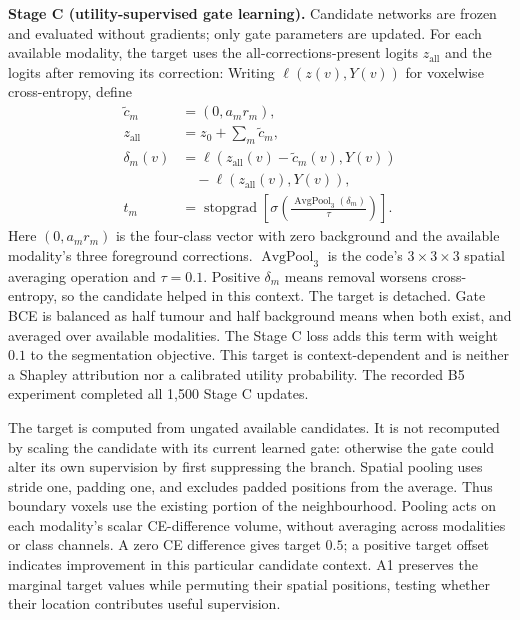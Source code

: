 \documentclass[conference]{IEEEtran}
\begin{document}
\textbf{Stage C (utility-supervised gate learning).} Candidate networks are frozen and evaluated without gradients; only gate parameters are updated. For each available modality, the target uses the all-corrections-present logits $z_{\mathrm{all}}$ and the logits after removing its correction:
Writing $\ell(z(v),Y(v))$ for voxelwise cross-entropy, define
\begin{align}
\tilde c_m&=(0,a_mr_m),\nonumber\\
z_{\mathrm{all}}&=z_0+\sum_m\tilde c_m,
\label{eq:candidates}\\
\delta_m(v)&=\ell(z_{\mathrm{all}}(v)-\tilde c_m(v),Y(v))\nonumber\\
&\quad-\ell(z_{\mathrm{all}}(v),Y(v)),
\label{eq:delta}\\
t_m&=\operatorname{stopgrad}\!\left[
\sigma\!\left(\frac{\operatorname{AvgPool}_{3}(\delta_m)}{\tau}\right)\right].
\label{eq:utility}
\end{align}
Here $(0,a_mr_m)$ is the four-class vector with zero background and the available modality's three foreground corrections. $\operatorname{AvgPool}_{3}$ is the code's $3\times3\times3$ spatial averaging operation and $\tau=0.1$. Positive $\delta_m$ means removal worsens cross-entropy, so the candidate helped in this context. The target is detached. Gate BCE is balanced as half tumour and half background means when both exist, and averaged over available modalities. The Stage C loss adds this term with weight $0.1$ to the segmentation objective. This target is context-dependent and is neither a Shapley attribution nor a calibrated utility probability. The recorded B5 experiment completed all 1,500 Stage C updates.

The target is computed from ungated available candidates. It is not recomputed by scaling the candidate with its current learned gate: otherwise the gate could alter its own supervision by first suppressing the branch. Spatial pooling uses stride one, padding one, and excludes padded positions from the average. Thus boundary voxels use the existing portion of the neighbourhood. Pooling acts on each modality's scalar CE-difference volume, without averaging across modalities or class channels. A zero CE difference gives target $0.5$; a positive target offset indicates improvement in this particular candidate context. A1 preserves the marginal target values while permuting their spatial positions, testing whether their location contributes useful supervision.
\end{document}
